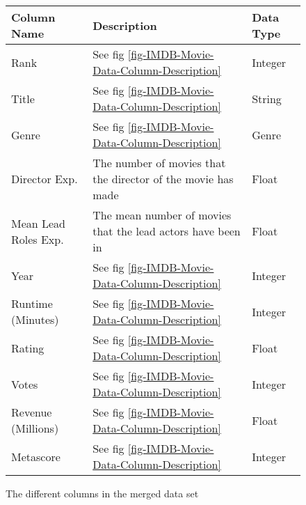         \begin{figure}[h]
            \begin{tabular}[width = \textwidth]{lll}
                \toprule
                Column Name &           Description                                                                 & Data Type \\
                \midrule
                Rank &                  See fig \ref*{fig-IMDB-Movie-Data-Column-Description}                       & Integer \\          
                Title &                 See fig \ref*{fig-IMDB-Movie-Data-Column-Description}                       & String \\
                Genre &                 See fig \ref*{fig-IMDB-Movie-Data-Column-Description}                       & Genre \\
                Director Exp. &         The number of movies that the director of the movie has made                & Float \\
                Mean Lead Roles Exp. &  The mean number of movies that the lead actors have been in                 & Float \\
                Year  &                 See fig \ref*{fig-IMDB-Movie-Data-Column-Description}                       & Integer \\
                Runtime (Minutes) &     See fig \ref*{fig-IMDB-Movie-Data-Column-Description}                       & Integer \\ 
                Rating   &              See fig \ref*{fig-IMDB-Movie-Data-Column-Description}                       & Float \\
                Votes   &               See fig \ref*{fig-IMDB-Movie-Data-Column-Description}                       & Integer \\ 
                Revenue (Millions) &    See fig \ref*{fig-IMDB-Movie-Data-Column-Description}                       & Float \\  
                Metascore   &           See fig \ref*{fig-IMDB-Movie-Data-Column-Description}                       & Integer \\
                \bottomrule
            \end{tabular}
        \caption[short]{The different columns in the merged data set}\label{fig-merged-data-column-description}
        \end{figure}

